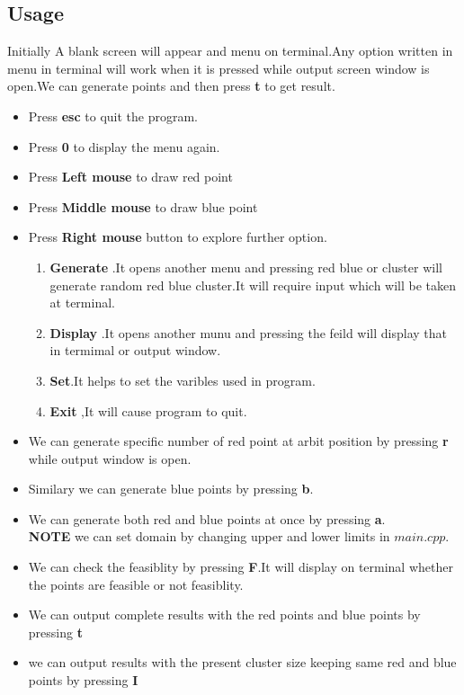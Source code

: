 \documentclass[a4paper,10pt]{report}
\begin{document}
\subsection{Usage}
Initially A blank screen will appear and menu on terminal.Any option written in menu in terminal will work when it
is pressed while output screen window is open.We can generate points and then press \textbf{t} to get result.
\begin{itemize}
 \item Press \textbf{esc} to quit the program.
 \item Press \textbf{0} to display the menu again.
 \item Press \textbf{Left mouse} to draw red point
 \item Press \textbf{Middle mouse} to draw blue point
 \item Press \textbf{Right mouse} button to explore further option.
 \begin{enumerate}
  \item \textbf{Generate} .It opens another menu and pressing red blue or cluster will generate random red blue cluster.It will
                 require input which will be taken at terminal.
  \item \textbf{Display} .It opens another munu and pressing the feild will display that in termimal or output window.
  \item \textbf{Set}.It helps to set the varibles used in program.
  \item \textbf{Exit} ,It will cause program to quit.
 \end{enumerate}
 \item We can generate specific number of red point at arbit position by pressing \textbf{r} while output window is open.
 \item Similary we can generate blue points by pressing \textbf{b}.
 \item We can generate both red and blue points at once by pressing \textbf{a}.\\
  \textbf{NOTE} we can set domain by changing upper and lower limits in $main.cpp$.
 \item We can check the feasiblity by pressing \textbf{F}.It will display on terminal whether the points are feasible
 or not feasiblity.
 \item We can output complete results with the red points and blue points by pressing \textbf{t}
 \item we can output results with the present cluster size keeping same red and blue points by pressing \textbf{I}

\end{itemize}
\end{document}
